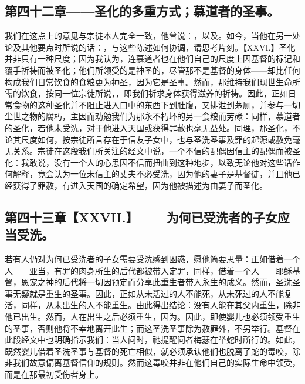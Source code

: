 
\subsection{第四十二章——圣化的多重方式；慕道者的圣事。}

我们在这点上的意见与宗徒本人完全一致，他曾说：，以及。如今，当他在另一处论及其他要点时所说的话：，与这些陈述如何协调，请思考片刻。【XXVI.】圣化并非只有一种尺度；因为我认为，连慕道者也在他们自己的尺度上因基督的标记和覆手祈祷而被圣化；他们所领受的是神圣的，尽管那不是基督的身体——却比任何构成我们日常饮食的食粮更为神圣，因为它是圣事。然而，那维持我们现世生命所需的饮食，按同一位宗徒所说，，即我们祈求身体获得滋养的祈祷。因此，正如日常食物的这种圣化并不阻止进入口中的东西下到肚腹，又排泄到茅厕，并参与一切尘世之物的腐朽，主因而劝勉我们为那永不朽坏的另一食粮而劳碌：同样，慕道者的圣化，若他未受洗，对于他进入天国或获得罪赦也毫无益处。同理，那圣化，不论其尺度如何，按宗徒所言存在于信友子女中，也与圣洗圣事及罪的起源或赦免毫无关系。宗徒在这段我们所关注的经文中说，一个不信的配偶因信主的配偶而被圣化：我敢说，没有一个人的心思因不信而扭曲到这种地步，以致无论他对这些话作何解释，竟会认为一位未信主的丈夫不必受洗，因为他的妻子是基督徒，并且他已经获得了罪赦，有进入天国的确定希望，因为他被描述为由妻子而圣化。\par


\subsection{第四十三章【XXVII.】——为何已受洗者的子女应当受洗。}

若有人仍对为何已受洗者的子女需要受洗感到困惑，愿他简要思量：正如借着一个人——亚当，有罪的肉身所生的后代都被带入定罪，同样，借着一个人——耶稣基督，恩宠之神的后代将一切因预定而分享此重生者带入永生的成义。然而，圣洗圣事无疑就是重生的圣事。因此，正如从未活过的人不能死，从未死过的人不能复活，同样，从未出生的人不能重生。由此得出结论：没有人能在其父内重生，除非他已出生。然而，人在出生之后必须重生，因为。因此，即使婴儿也必须领受重生的圣事，否则他将不幸地离开此生；而这圣洗圣事除为赦罪外，不另举行。基督在此段经文中也明确指示我们：当人问时，祂提醒问者梅瑟在举蛇时所行的。如此，既然婴儿借着圣洗圣事与基督的死亡相似，就必须承认他们也脱离了蛇的毒咬，除非我们故意偏离基督信仰的规则。然而这毒咬并非在他们自己的实际生命中领受，而是在那最初受伤者身上。\par

